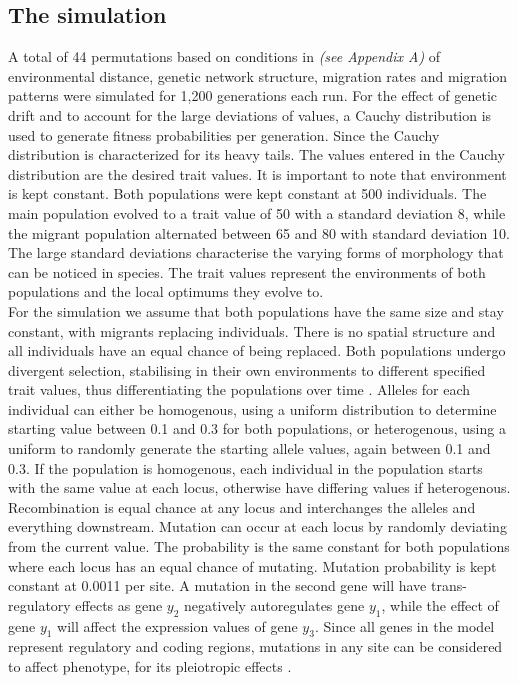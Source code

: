 \subsection{The simulation}
A total of 44 permutations based on conditions in \textit{(see Appendix A)} of environmental distance, genetic network structure, migration rates and migration patterns were simulated for 1,200 generations each run. For the effect of genetic drift and to account for the large deviations of values, a Cauchy distribution is used to generate fitness probabilities per generation. Since the Cauchy distribution is characterized for its heavy tails. The values entered in the Cauchy distribution are the desired trait values. It is important to note that environment is kept constant. Both populations were kept constant at 500 individuals. The main population evolved to a trait value of 50 with a standard deviation 8, while the migrant population alternated between 65 and 80 with standard deviation 10. The large standard deviations characterise the varying forms of morphology that can be noticed in species. The trait values represent the environments of both populations and the local optimums they evolve to.\\
For the simulation we assume that both populations have the same size and stay constant, with migrants replacing individuals.  There is no spatial structure and all individuals have an equal chance of being replaced. Both populations undergo divergent selection, stabilising in their own environments to different specified trait values, thus differentiating the populations over time \cite{sato2006effect}. Alleles for each individual can either be homogenous, using a uniform distribution to determine starting value between 0.1 and 0.3 for both populations, or heterogenous, using a uniform to randomly generate the starting allele values, again between 0.1 and 0.3. If the population is homogenous, each individual in the population starts with the same value at each locus, otherwise have differing values if heterogenous.
Recombination is equal chance at any locus and interchanges the alleles and everything downstream. Mutation can occur at each locus by randomly deviating from the current value. The probability is the same constant for both populations where each locus has an equal chance of mutating. Mutation probability is kept constant at 0.0011 per site. A mutation in the second gene will have trans-regulatory effects as gene $y_2$ negatively autoregulates gene $y_1$, while the effect of gene $y_1$ will affect the expression values of gene $y_3$. Since all genes in the model represent regulatory and coding regions, mutations in any site can be considered to affect phenotype, for its pleiotropic effects \cite{rice2019evolution,landry2007genetic}.\\
